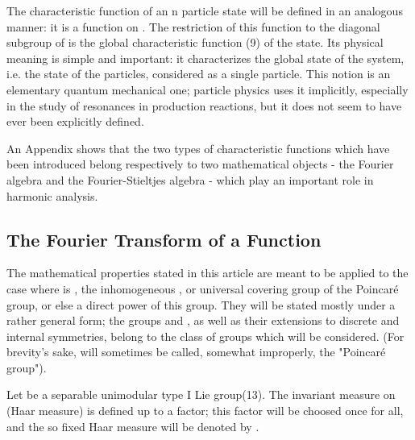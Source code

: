 \documentclass[a4paper,11pt]{article}
\begin{document}
The characteristic function of an n particle state will be defined in an analogous manner: it 
is a function on \coordHE{}. The restriction of this function to the diagonal subgroup of \coordHE{} is 
the global characteristic function (9) of the state. Its physical meaning is simple and 
important: it characterizes the global state of the system, i.e. the state of the \coordHE{} 
particles, considered as a single particle. This notion is an elementary quantum mechanical 
one; particle physics uses it implicitly, especially in the study of resonances in production 
reactions, but it does not seem to have ever been explicitly defined. 

An Appendix shows that the two types of characteristic functions which have been introduced 
belong respectively to two mathematical objects - the Fourier algebra and the Fourier-Stieltjes 
algebra - which play an important role in harmonic analysis.

\subsection{The Fourier Transform of a Function}

The mathematical properties stated in this article are meant to be applied to the case where 
\coordHE{} is \coordHE{}, the inhomogeneous \coordHE{}, or universal covering group of the Poincar\'e  group, or 
else a direct power of this group.  They will be stated mostly under a rather general form; the 
groups \coordHE{} and \coordHE{}, as well as their extensions to discrete and internal symmetries, belong 
to the class of groups which will be considered. (For brevity's sake, \coordHE{} will sometimes be 
called, somewhat improperly, the "Poincar\'e  group"). 

Let \coordHE{} be a separable unimodular type I Lie group(13). The invariant measure on \coordHE{} (Haar 
measure) is defined up to a factor; this factor will be choosed once for all, and the so fixed 
Haar measure will be denoted by \coordHE{}. 
\end{document}
